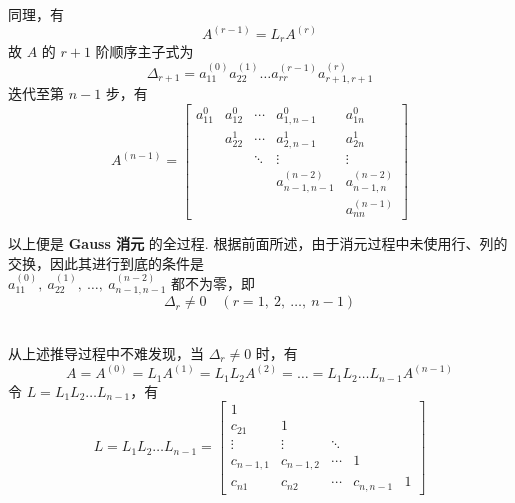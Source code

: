             同理，有
            \begin{equation*}
                A^{(r-1)} = L_rA^{(r)}
            \end{equation*}
            故 $A$ 的 $r+1$ 阶顺序主子式为 
            \begin{equation*}
                \Delta_{r+1} = a_{11}^{(0)}a_{22}^{(1)} \dots a_{rr}^{(r-1)}a_{r+1,r+1}^{(r)}
            \end{equation*}
            迭代至第 $n-1$ 步，有
            \begin{equation*}
                A^{(n-1)} = \begin{bmatrix}
                    a_{11}^{0} & a_{12}^{0} & \cdots & a_{1,n-1}^{0} & a_{1n}^{0} \\ & a_{22}^{1} & \cdots & a_{2,n-1}^{1} & a_{2n}^{1} \\ & & \ddots & \vdots & \vdots \\ & & & a_{n-1,n-1}^{(n-2)} & a_{n-1,n}^{(n-2)} \\ & & & & a_{nn}^{(n-1)}
                \end{bmatrix}
            \end{equation*}
            \par 以上便是 \textbf{Gauss 消元} 的全过程. 根据前面所述，由于消元过程中未使用行、列的交换，因此其进行到底的条件是 \\ $a_{11}^{(0)}, \ a_{22}^{(1)}, \ \dots, \ a_{n-1, n-1}^{(n-2)}$ 都不为零，即
            \begin{equation*}
                \Delta_r \ne 0 \quad (r = 1, \ 2, \ \dots, \ n-1)
            \end{equation*}
            \\
            \par 从上述推导过程中不难发现，当 $\Delta_r \ne 0$ 时，有 
            \begin{equation*}
                A = A^{(0)} = L_1A^{(1)} = L_1L_2A^{(2)} = \dots = L_1L_2 \dots L_{n-1}A^{(n-1)}
            \end{equation*}
            令 $L = L_1L_2 \dots L_{n-1}$，有
            \begin{equation*}
                L = L_1L_2 \dots L_{n-1} = \begin{bmatrix}
                    1 & & & & \\ c_{21} & 1 & & & \\ \vdots & \vdots & \ddots & & \\ c_{n-1,1} & c_{n-1,2} & \cdots & 1 & \\ c_{n1} & c_{n2} & \cdots & c_{n,n-1} & 1
                \end{bmatrix}
            \end{equation*}
